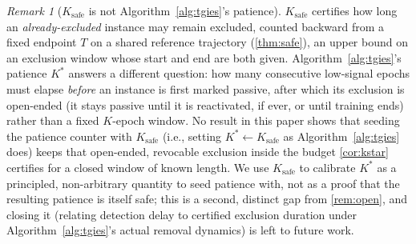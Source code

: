 \documentclass{article}
\theoremstyle{plain}
\theoremstyle{definition}
\theoremstyle{remark}
\newtheorem{remark}[theorem]{Remark}
\begin{document}
\begin{remark}[$K_{\mathrm{safe}}$ is not Algorithm~\ref{alg:tgies}'s patience]
\label{rem:kmismatch}
$K_{\mathrm{safe}}$ certifies how long an \emph{already-excluded} instance may remain excluded, counted backward from a fixed endpoint $T$ on a shared reference trajectory (\cref{thm:safe}), an upper bound on an exclusion window whose start and end are both given. Algorithm~\ref{alg:tgies}'s patience $K^*$ answers a different question: how many consecutive low-signal epochs must elapse \emph{before} an instance is first marked passive, after which its exclusion is open-ended (it stays passive until it is reactivated, if ever, or until training ends) rather than a fixed $K$-epoch window. No result in this paper shows that seeding the patience counter with $K_{\mathrm{safe}}$ (i.e., setting $K^*\leftarrow K_{\mathrm{safe}}$ as Algorithm~\ref{alg:tgies} does) keeps that open-ended, revocable exclusion inside the budget \cref{cor:kstar} certifies for a closed window of known length. We use $K_{\mathrm{safe}}$ to calibrate $K^*$ as a principled, non-arbitrary quantity to seed patience with, not as a proof that the resulting patience is itself safe; this is a second, distinct gap from \cref{rem:open}, and closing it (relating detection delay to certified exclusion duration under Algorithm~\ref{alg:tgies}'s actual removal dynamics) is left to future work.
\end{remark}
\end{document}

